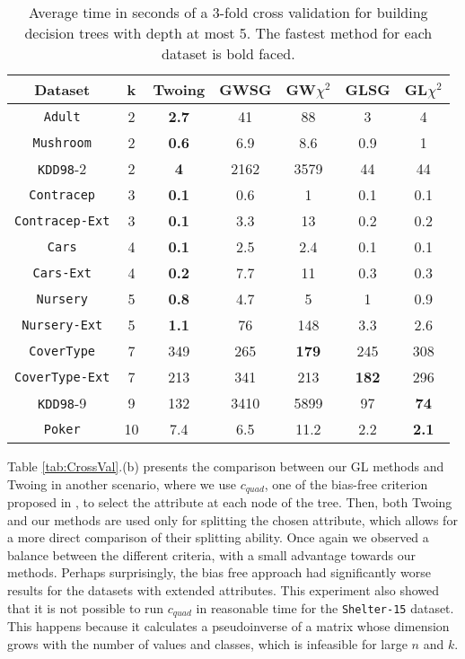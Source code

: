 \begin{table*}[]
\small
\centering
\caption{Average time in seconds of a 3-fold cross validation
for building decision trees with depth at most 5.
The fastest method for each dataset is bold faced.}
\begin{tabular}{c|c|c|c|c|c|c}
Dataset & k & Twoing  & GWSG  &         GW$\chi^2$      & GLSG  & GL$\chi^2$      \\ \hline
{\tt Adult}         & 2 & {\bf  2.7} & 41   & 88   & 3   & 4   \\
{\tt Mushroom}      & 2 & {\bf 0.6} & 6.9  & 8.6  & 0.9 & 1   \\
{\tt KDD98}-2       & 2 & {\bf 4}   & 2162 & 3579 & 44  & 44  \\
{\tt Contracep}     & 3 & {\bf 0.1} & 0.6  & 1    & 0.1 & 0.1 \\
{\tt Contracep-Ext} & 3 & {\bf 0.1} & 3.3  & 13   & 0.2 & 0.2 \\
{\tt Cars}          & 4 & {\bf 0.1} & 2.5  & 2.4  & 0.1 & 0.1 \\
{\tt Cars-Ext}      & 4 & {\bf 0.2} & 7.7  & 11   & 0.3 & 0.3 \\
{\tt Nursery}       & 5 & {\bf 0.8} & 4.7  & 5    & 1   & 0.9 \\
{\tt Nursery-Ext}   & 5 & {\bf 1.1} & 76  & 148  & 3.3 & 2.6   \\
{\tt CoverType}     & 7 & 349 & 265  & {\bf 179}  & 245 & 308 \\
{\tt CoverType-Ext} & 7 & 213 & 341  & 213  & {\bf 182} & 296 \\
{\tt KDD98}-9       & 9 & 132 & 3410 & 5899 & 97  & {\bf 74}  \\ 
{\tt Poker}     & 10 & 7.4 & 6.5 & 11.2 & 2.2  & {\bf 2.1}  
\end{tabular}
\label{tab:time}
\end{table*}



Table \ref{tab:CrossVal}.(b) presents the 
comparison between our GL methods and Twoing in another scenario,
where we use $c_{quad}$, one of the bias-free   criterion proposed in \cite{Hothorn:2006:URP}, to select the attribute at each node of the tree. 
Then, both Twoing and our methods are  used only for splitting the chosen attribute,  which allows for a  more direct comparison of their splitting ability. Once again we observed a balance between the different criteria, with a small advantage towards our methods. Perhaps surprisingly, the bias free approach had significantly worse results for the datasets with extended attributes. This experiment also showed that it is not possible to run $c_{quad}$ in reasonable time for the {\tt Shelter-15} dataset. This happens because it calculates a pseudoinverse of a matrix whose dimension grows with the number of values and classes, which is infeasible for large $n$ and $k$.


